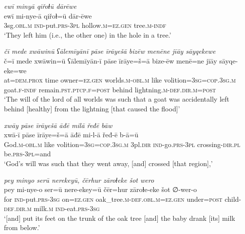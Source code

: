 \ea \label{ZB.41}
\textit{ewī minyā qiřoɫū dārēwe} \\ 
\gll ewī mi-nye-ā qiřoɫ=ū dār-ēwe \\ 
 3sg\textsc{.obl}\textsc{.m} \textsc{ind-}put\textsc{.prs}\textsc{-3pl} hollow\textsc{.m}\textsc{\textsc{=ez.gen}} tree\textsc{.m}\textsc{-indf} \\ 
\glt `They left him (i.e., the other one) in the hole in a tree.'
\z 
 
\ea \label{ZB.42}
\textit{čī mede xwāwinū ʕālemīyānī pāse īrāyešā bizēw menēne jīāy sāyqekewe} \\ 
\gll č=ī mede xwāwin=ū ʕālemīyān-ī pāse īrāye=š=ā bize-ēw menē=ne jīāy sāyqe-eke=we \\ 
 at=\textsc{dem.prox} time owner\textsc{\textsc{=ez.gen}} worlds\textsc{.m}\textsc{-obl}\textsc{.m} like volition\textsc{=3sg}\textsc{=cop}\textsc{.3sg}\textsc{.m} goat\textsc{.f}\textsc{-indf} remain\textsc{.pst}\textsc{.ptcp}\textsc{.f}\textsc{=\textsc{post}} behind lightning\textsc{.m}\textsc{-def}\textsc{.dir}\textsc{.m}\textsc{=\textsc{post}} \\ 
\glt `The will of the lord of all worlds was such that a goat was accidentally left behind [healthy] from the lightning [that caused the flood]'
\z 
 
\ea \label{ZB.43}
\textit{xwāy pāse īrāyešā āđē milā řeđē bāw} \\ 
\gll xwā-ī pāse īrāye=š=ā āđē mi-l-ā řeđ-ē b-ā=ū \\ 
 God\textsc{.m}\textsc{-obl}\textsc{.m} like volition\textsc{=3sg}\textsc{=cop}\textsc{.3sg}\textsc{.m} 3pl\textsc{.dir} \textsc{ind-}go\textsc{.prs}\textsc{-3pl} crossing\textsc{-dir}\textsc{.pl} be\textsc{.prs}\textsc{-3pl}=and \\ 
\glt `God’s will was such that they went away, [and] crossed [that region],'
\z 
 
\ea \label{ZB.45}
\textit{pey minyo serū nerekeyū, čērhur zāroɫeke šot wero} \\ 
\gll pey mi-nye-o ser=ū nere-ekey=ū čēr=hur zāroɫe-eke šot ∅-wer-o \\ 
 for \textsc{ind-}put\textsc{.prs}\textsc{-3sg} on\textsc{\textsc{=ez.gen}} oak\_tree\textsc{.m}\textsc{-def}\textsc{.obl}\textsc{.m}\textsc{\textsc{=ez.gen}} under\textsc{=\textsc{post}} child\textsc{-def}\textsc{.dir}\textsc{.m} milk\textsc{.m} \textsc{ind-}eat\textsc{.prs}\textsc{-3sg} \\ 
\glt `[and] put its feet on the trunk of the oak tree [and] the baby drank [its] milk from below.'
\z 
 
